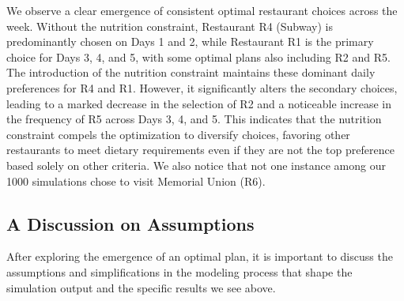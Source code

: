 \documentclass{article}
\begin{document}
We observe a clear emergence of consistent optimal restaurant choices across the week. 
Without the nutrition constraint, Restaurant R4 (Subway) is predominantly chosen on Days 1 and 2, while Restaurant R1 is the primary choice for Days 3, 4, and 5, with some optimal plans also including R2 and R5. The introduction of the nutrition constraint maintains these dominant daily preferences for R4 and R1. However, it significantly alters the secondary choices, leading to a marked decrease in the selection of R2 and a noticeable increase in the frequency of R5 across Days 3, 4, and 5. This indicates that the nutrition constraint compels the optimization to diversify choices, favoring other restaurants to meet dietary requirements even if they are not the top preference based solely on other criteria. We also notice that not one instance among our 1000 simulations chose to visit Memorial Union (R6).

\subsection{A Discussion on Assumptions}
After exploring the emergence of an optimal plan, it is important to discuss the assumptions and simplifications in the modeling process that shape the simulation output and the specific results we see above.
\end{document}
